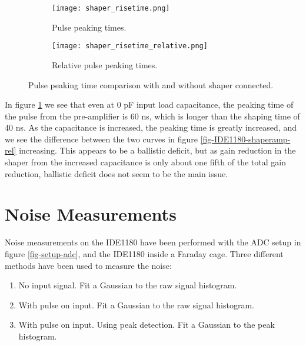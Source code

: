 \documentclass[../main/thesis.tex]{subfiles}
\begin{document}
\begin{figure}[p]
	\centering
	\begin{subfigure}{.5\textwidth}
		\centering
		\texttt{[image: shaper\_risetime.png]}
		\caption{Pulse peaking times.}
		\label{fig-IDE1180-shaperrisetime-}
	\end{subfigure}%
	\begin{subfigure}{.5\textwidth}
		\centering
		\texttt{[image: shaper\_risetime\_relative.png]}
		\caption{Relative pulse peaking times.}
		\label{fig-IDE1180-shaperrisetime-rel}
	\end{subfigure}
	\caption{Pulse peaking time comparison with and without shaper connected.}
	\label{fig-IDE1180-shaperrisetime}
\end{figure}

In figure \ref{fig-IDE1180-shaperrisetime-} we see that even at 0 pF input load capacitance, the peaking time of the pulse from the pre-amplifier is 60 ns, which is longer than the shaping time of 40 ns. As the capacitance is increased, the peaking time is greatly increased, and we see the difference between the two curves in figure \ref{fig-IDE1180-shaperamp-rel} increasing. This appears to be a ballistic deficit, but as gain reduction in the shaper from the increased capacitance is only about one fifth of the total gain reduction, ballistic deficit does not seem to be the main issue.  


\newpage
\section{Noise Measurements}
\label{ide-noise}

Noise measurements on the IDE1180 have been performed with the ADC setup in figure \ref{fig-setup-adc}, and the IDE1180 inside a Faraday cage. Three different methods have been used to measure the noise:
\begin{enumerate}  
	\item No input signal. Fit a Gaussian to the raw signal histogram. 
	\item With pulse on input. Fit a Gaussian to the raw signal histogram.  
	\item With pulse on input. Using peak detection. Fit a Gaussian to the peak histogram.   
\end{enumerate}
\end{document}
